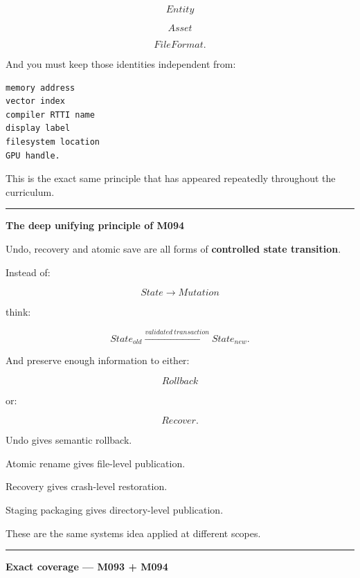 \[
Entity
\]

\[
Asset
\]

\[
FileFormat.
\]

And you must keep those identities independent from:

\begin{verbatim}
memory address
vector index
compiler RTTI name
display label
filesystem location
GPU handle.
\end{verbatim}

This is the exact same principle that has appeared repeatedly throughout the curriculum.

\begin{center}\rule{0.5\linewidth}{0.5pt}\end{center}

\textbf{The deep unifying principle of M094}

Undo, recovery and atomic save are all forms of \textbf{controlled state transition}.

Instead of:

\[
State
\rightarrow
Mutation
\]

think:

\[
\boxed{
State_{old}
\xrightarrow{validated\ transaction}
State_{new}.
}
\]

And preserve enough information to either:

\[
Rollback
\]

or:

\[
Recover.
\]

Undo gives semantic rollback.

Atomic rename gives file-level publication.

Recovery gives crash-level restoration.

Staging packaging gives directory-level publication.

These are the same systems idea applied at different scopes.

\begin{center}\rule{0.5\linewidth}{0.5pt}\end{center}

\textbf{Exact coverage --- M093 + M094}

